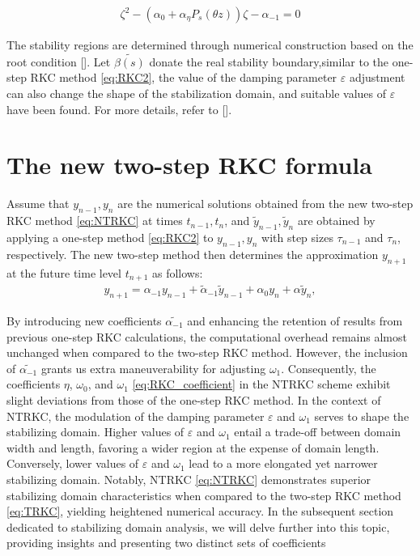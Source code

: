 \documentclass[review,fleqn]{elsarticle}
\begin{document}
\begin{align}
\zeta^2 - (\alpha_0 + \alpha_\eta P_s(\theta z))\zeta - \alpha_{-1} = 0 
\label{eq:TRKCploy}
\end{align}

The stability regions are determined through numerical construction based on the root condition []. Let $\tilde{\beta(s)}$ donate the real stability boundary,similar to the one-step RKC method \eqref{eq:RKC2}, 
the value of the damping parameter $\varepsilon$ adjustment can also change the shape of the stabilization domain, and suitable values of $\varepsilon$ have been found. For more details, refer to [].



\section{The new two-step RKC formula}

Assume that $y_{n-1},y_n$ are the numerical solutions obtained from the new two-step RKC method \eqref{eq:NTRKC} at times $t_{n-1},t_n$, and $\tilde{y}_{n-1},\tilde{y}_n$ are obtained by applying a one-step method \eqref{eq:RKC2} to $y_{n-1},y_n$ with step sizes $\tau_{n-1}$ and $\tau_n$, respectively.
The new two-step method then determines the approximation $y_{n+1}$ at the future time level $t_{n+1}$ as follows:
\begin{align}
    y_{n+1} = \alpha_{-1}y_{n-1} + \tilde{\alpha}_{-1}\tilde{y}_{n-1} + \alpha_0y_n + \alpha\tilde{y}_n,
    \label{eq:NTRKC}
\end{align}

 By introducing new coefficients $\tilde{\alpha_{-1}}$ and enhancing the retention of results from previous one-step RKC calculations,
 the computational overhead remains almost unchanged when compared to the two-step RKC method. However, 
 the inclusion of $\tilde{\alpha_{-1}}$ grants us extra maneuverability for adjusting $\omega_{1}$. Consequently, the coefficients $\eta$, $\omega_{0}$, 
 and $\omega_{1}$  \eqref{eq:RKC_coefficient} in the NTRKC scheme exhibit slight deviations from those of the one-step RKC method. 
 In the context of NTRKC, the modulation of the damping parameter $\varepsilon$ and $\omega_{1}$ serves to shape the stabilizing domain. Higher values of $\varepsilon$ 
 and $\omega_{1}$ entail a trade-off between domain width and length, favoring a wider region at the expense of domain length. Conversely, lower values of $\varepsilon$ and $\omega_{1}$ 
 lead to a more elongated yet narrower stabilizing domain. Notably, NTRKC \eqref{eq:NTRKC} demonstrates superior stabilizing domain characteristics when compared to the two-step RKC method \eqref{eq:TRKC}, 
 yielding heightened numerical accuracy. In the subsequent section dedicated to stabilizing domain analysis, we will delve further into this topic, 
 providing insights and presenting two distinct sets of coefficients
\end{document}

